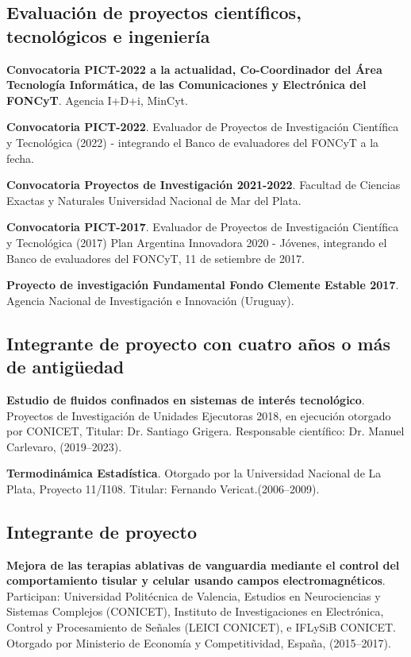 \documentclass[margin,line]{res}
\begin{document}
\begin{resume}
\subsection{ Evaluación de proyectos científicos, tecnológicos e ingeniería}

{\bf Convocatoria PICT-2022 a la actualidad, Co-Coordinador del Área Tecnología Informática, de las Comunicaciones y Electrónica del FONCyT}. Agencia I+D+i, MinCyt.

{\bf Convocatoria PICT-2022}. Evaluador de Proyectos de Investigación Científica y Tecnológica (2022) - integrando el Banco de evaluadores del FONCyT a la fecha.

{\bf Convocatoria Proyectos de Investigación 2021-2022}. Facultad de Ciencias Exactas y Naturales Universidad Nacional de Mar del Plata.

{\bf Convocatoria PICT-2017}. Evaluador de Proyectos de Investigación Científica y Tecnológica (2017) Plan Argentina Innovadora 2020 - Jóvenes, integrando el Banco de evaluadores del FONCyT, 11 de setiembre de 2017.

{\bf Proyecto de investigación Fundamental Fondo Clemente Estable 2017}. Agencia Nacional de Investigación e Innovación (Uruguay).
%

\subsection{ Integrante de proyecto con cuatro años o más de antigüedad}

\textbf{Estudio de fluidos confinados en sistemas de interés tecnológico}. Proyectos de Investigación de Unidades Ejecutoras 2018, en ejecución otorgado por CONICET, Titular: Dr. Santiago Grigera. Responsable científico: Dr. Manuel Carlevaro, (2019--2023). 

\textbf{Termodinámica Estadística}. Otorgado por la Universidad Nacional de La Plata, Proyecto 11/I108. Titular: Fernando Vericat.(2006--2009). 

\subsection{ Integrante de proyecto}

\textbf{Mejora de las terapias ablativas de vanguardia mediante el control del comportamiento tisular y celular usando campos electromagnéticos}. Participan: Universidad Politécnica de Valencia, Estudios en Neurociencias y Sistemas Complejos (CONICET), Instituto de Investigaciones en Electrónica, Control y Procesamiento de Señales (LEICI CONICET), e IFLySiB CONICET. Otorgado por Ministerio de Economía y Competitividad, España, (2015--2017).


\end{resume}
\end{document}
